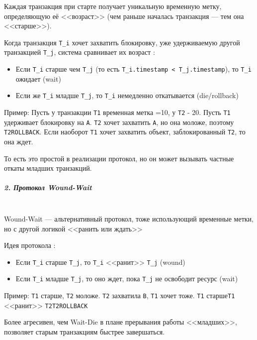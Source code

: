  Каждая транзакция при старте получает уникальную временную метку, определяющую её <<возраст>> (чем раньше началась транзакция — тем она <<старше>>).
 
 Когда транзакция \texttt{T\_i} хочет захватить блокировку, уже удерживаемую другой транзакцией \texttt{T\_j}, система сравнивает их возраст \autocite{Silberschatz, ElmasriNavathe}:
 \begin{itemize}
     \item Если \texttt{T\_i} старше чем \texttt{T\_j} (то есть \texttt{T\_i.timestamp < T\_j.timestamp}), то \texttt{T\_i} ожидает (wait)
     \item Если же \texttt{T\_i} младше \texttt{T\_j}, то \texttt{T\_i} немедленно откатывается (die/rollback)
 \end{itemize}
 
 Пример:
 Пусть у транзакции \texttt{T1} временная метка =10, у \texttt{T2} - 20. Пусть \texttt{T1} удерживает блокировку на \texttt{A}. \texttt{T2} хочет захватить \texttt{A}, но она моложе, поэтому \texttt{T2\textrightarrow ROLLBACK}. Если наоборот \texttt{T1} хочет захватить объект, заблокированный \texttt{T2}, то она ждет.
 
 То есть это простой в реализации протокол, но он может вызывать частные откаты младших транзакций.
 
 \subparagraph{2. Протокол Wound-Wait} ~\\

 Wound-Wait — альтернативный протокол, тоже использующий временные метки, но с другой логикой <<ранить или ждать>>
 
 Идея протокола \autocite{Silberschatz, ElmasriNavathe}:
 \begin{itemize}
     \item Если \texttt{T\_i} старше \texttt{T\_j}, то \texttt{T\_i} <<ранит>> \texttt{T\_j} (wound)
     \item Если \texttt{T\_i} младше \texttt{T\_j}, то оно ждет, пока \texttt{T\_j} не освободит ресурс (wait)
 \end{itemize}
 
 Пример:
 \texttt{T1} старше, \texttt{T2} моложе. \texttt{T2} захватила \texttt{B}, \texttt{T1} хочет тоже. \texttt{T1} старше\textrightarrow \texttt{T1} <<ранит>> \texttt{T2}\textrightarrow \texttt{T2\textrightarrow ROLLBACK} 
 
 Более агресивен, чем Wait-Die в плане прерывания работы <<младших>>, позволяет старым транзакциям быстрее завершаться.
 
